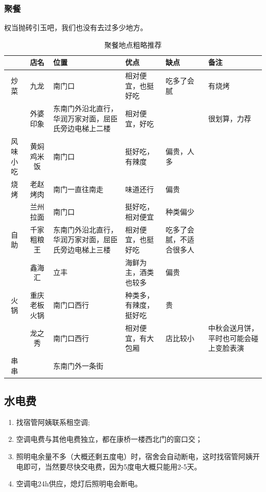         \subsubsection{聚餐}
            权当抛砖引玉吧，我们也没有去过多少地方。
            \begin{table}
                \begin{tabular}{c|c|p{3cm}|p{3cm}|p{2cm}|p{3cm}}
                    \hline
                    \hline
                          &  店名  &  位置   & 优点   & 缺点   & 备注  \\ \hline
                    炒菜  &  九龙  &  南门口  &  相对便宜，也挺好吃  &  吃多了会腻 & 有烧烤  \\ \hline
                          & 外婆印象 & 东南门外沿北直行，华润万家对面，屈臣氏旁边电梯上二楼 & 相对便宜，好吃 & & 很划算，力荐 \\ \hline
                    风味小吃 &  黄焖鸡米饭  & 南门口  & 挺好吃，有辣度  &  偏贵，人多   &  \\ \hline
                    烧烤  &  老赵烤肉 & 南门一直往南走 &  味道还行 & 偏贵  & \\ \hline
                         &  兰州拉面 & 南门口  & 挺好吃，相对便宜 & 种类偏少  &  \\ \hline
                    自助 &  千家粗粮王 & 东南门外沿北直行，华润万家对面，屈臣氏旁边电梯上三楼 & 相对便宜，也挺好吃 & 吃多了会腻，不适合很多人 &  \\ \hline
                         &  鑫海汇  &  立丰  &  海鲜为主，酒类也较多  &  偏贵  &  \\ \hline
                    火锅 &  重庆老板火锅 & 南门口西行 & 种类多，有辣度，挺好吃 & 贵  & \\ \hline
                         &  龙之秀  & 南门口西行  &  相对便宜，有大包厢  & 店比较小  & 中秋会送月饼，平时也可能会碰上变脸表演\\ \hline
                    串串  &   & 东南门外一条街   & & & \\ \hline    
                \end{tabular}
                \caption{聚餐地点粗略推荐}
                \label{jucan}
            \end{table}

    \subsection{水电费}
    \begin{enumerate}
        \item 找宿管阿姨联系租空调;
        \item 空调电费与其他电费独立，都在康桥一楼西北门的窗口交；
        \item 照明电余量不多（大概还剩五度电）时，宿舍会自动断电，这时找宿管阿姨开电即可，当然要尽快交电费，因为5度电大概只能用2-5天。
        \item 空调电24h供应，熄灯后照明电会断电。
    \end{enumerate}

